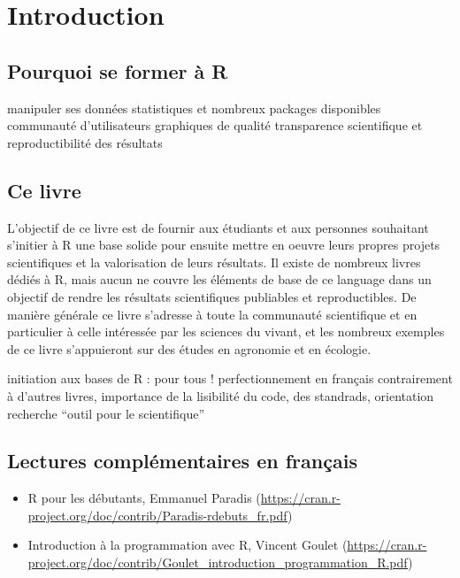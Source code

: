 \documentclass[]{book}
\providecommand{\tightlist}{%
  \setlength{\itemsep}{0pt}\setlength{\parskip}{0pt}}
\begin{document}
\chapter{Introduction}\label{intro}

\section{Pourquoi se former à R}\label{pourquoi-se-former-a-r}

manipuler ses données statistiques et nombreux packages disponibles
communauté d'utilisateurs graphiques de qualité transparence
scientifique et reproductibilité des résultats

\section{Ce livre}\label{ce-livre}

L'objectif de ce livre est de fournir aux étudiants et aux personnes
souhaitant s'initier à R une base solide pour ensuite mettre en oeuvre
leurs propres projets scientifiques et la valorisation de leurs
résultats. Il existe de nombreux livres dédiés à R, mais aucun ne couvre
les éléments de base de ce language dans un objectif de rendre les
résultats scientifiques publiables et reproductibles. De manière
générale ce livre s'adresse à toute la communauté scientifique et en
particulier à celle intéressée par les sciences du vivant, et les
nombreux exemples de ce livre s'appuieront sur des études en agronomie
et en écologie.

initiation aux bases de R : pour tous ! perfectionnement en français
contrairement à d'autres livres, importance de la lisibilité du code,
des standrads, orientation recherche ``outil pour le scientifique''

\section{Lectures complémentaires en
français}\label{lectures-complementaires-en-francais}

\begin{itemize}
\tightlist
\item
  R pour les débutants, Emmanuel Paradis
  (\url{https://cran.r-project.org/doc/contrib/Paradis-rdebuts_fr.pdf})
\item
  Introduction à la programmation avec R, Vincent Goulet
  (\url{https://cran.r-project.org/doc/contrib/Goulet_introduction_programmation_R.pdf})
\end{itemize}
\end{document}
